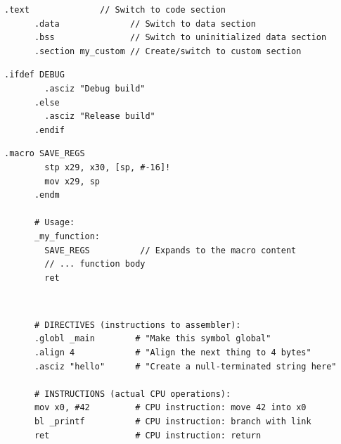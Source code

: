   \begin{example}
    \label{ex:section-control}
    \begin{lstlisting}[language=assembly]
      .text              // Switch to code section
      .data              // Switch to data section
      .bss               // Switch to uninitialized data section
      .section my_custom // Create/switch to custom section
    \end{lstlisting}
  \end{example}

  \begin{example}
    \label{ex:conditional-assembly}
    \begin{lstlisting}[language=assembly]
      .ifdef DEBUG
        .asciz "Debug build"
      .else  
        .asciz "Release build"
      .endif
    \end{lstlisting}
  \end{example}

  \begin{example}[Macros]
    \label{ex:macros}
    \begin{lstlisting}[language=assembly]
      .macro SAVE_REGS
        stp x29, x30, [sp, #-16]!
        mov x29, sp
      .endm

      # Usage:
      _my_function:
        SAVE_REGS          // Expands to the macro content
        // ... function body
        ret
    \end{lstlisting}
  \end{example}

  \begin{example}[]
    \label{ex:directive}
    \begin{lstlisting}
      
    \end{lstlisting}
  \end{example}

  \begin{example}
    \label{ex:assembler-directives-and-instructions}
    
    \begin{lstlisting}
      # DIRECTIVES (instructions to assembler):
      .globl _main        # "Make this symbol global"
      .align 4            # "Align the next thing to 4 bytes"
      .asciz "hello"      # "Create a null-terminated string here"

      # INSTRUCTIONS (actual CPU operations):
      mov x0, #42         # CPU instruction: move 42 into x0
      bl _printf          # CPU instruction: branch with link
      ret                 # CPU instruction: return 
    \end{lstlisting}
  \end{example}


